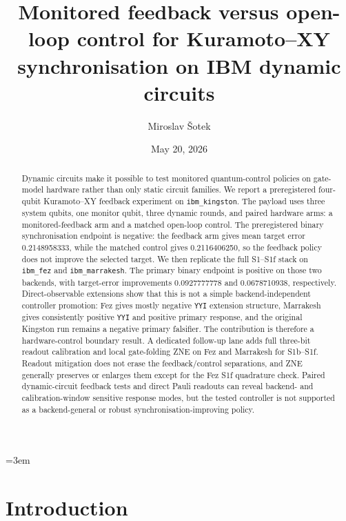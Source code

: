 \documentclass[preprint,aps,physrev,superscriptaddress,floatfix,longbibliography]{revtex4-2}
\begin{document}
\emergencystretch=3em

\title{Monitored feedback versus open-loop control for Kuramoto--XY synchronisation on IBM dynamic circuits}

\author{Miroslav \v{S}otek}

\date{May 20, 2026}

\begin{abstract}
Dynamic circuits make it possible to test monitored quantum-control policies
on gate-model hardware rather than only static circuit families. We report a
preregistered four-qubit Kuramoto--XY feedback experiment on
\texttt{ibm\_kingston}. The payload uses three system qubits, one monitor
qubit, three dynamic rounds, and paired hardware arms: a monitored-feedback
arm and a matched open-loop control. The preregistered binary synchronisation
endpoint is negative: the feedback arm gives mean target error 0.2148958333,
while the matched control gives 0.2116406250, so the feedback policy does not
improve the selected target. We then replicate the full S1--S1f stack on
\texttt{ibm\_fez} and \texttt{ibm\_marrakesh}. The primary binary endpoint is
positive on those two backends, with target-error improvements 0.0927777778
and 0.0678710938, respectively. Direct-observable extensions show that this
is not a simple backend-independent controller promotion: Fez gives mostly
negative \texttt{YYI} extension structure, Marrakesh gives consistently
positive \texttt{YYI} and positive primary response, and the original
Kingston run remains a negative primary falsifier. The contribution is
therefore a hardware-control boundary result. A dedicated follow-up lane adds
full three-bit readout calibration and local gate-folding ZNE on Fez and
Marrakesh for S1b--S1f. Readout mitigation does not erase the
feedback/control separations, and ZNE generally preserves or enlarges them
except for the Fez S1f quadrature check. Paired dynamic-circuit feedback
tests and direct Pauli readouts can reveal backend- and calibration-window
sensitive response modes, but the tested controller is not supported as a
backend-general or robust synchronisation-improving policy.
\end{abstract}

\maketitle

\section{Introduction}
\end{document}

